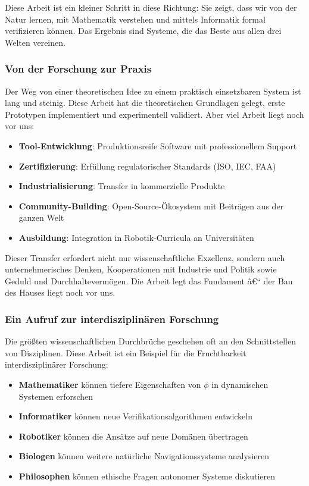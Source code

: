 ﻿\documentclass[a4paper,12pt]{article}
\theoremstyle{definition}
\begin{document}
Diese Arbeit ist ein kleiner Schritt in diese Richtung: Sie zeigt, dass wir von der Natur lernen, mit Mathematik verstehen und mittels Informatik formal verifizieren können. Das Ergebnis sind Systeme, die das Beste aus allen drei Welten vereinen.

\subsubsection{Von der Forschung zur Praxis}

Der Weg von einer theoretischen Idee zu einem praktisch einsetzbaren System ist lang und steinig. Diese Arbeit hat die theoretischen Grundlagen gelegt, erste Prototypen implementiert und experimentell validiert. Aber viel Arbeit liegt noch vor uns:

\begin{itemize}
	\item \textbf{Tool-Entwicklung}: Produktionsreife Software mit professionellem Support
	\item \textbf{Zertifizierung}: Erfüllung regulatorischer Standards (ISO, IEC, FAA)
	\item \textbf{Industrialisierung}: Transfer in kommerzielle Produkte
	\item \textbf{Community-Building}: Open-Source-Ökosystem mit Beiträgen aus der ganzen Welt
	\item \textbf{Ausbildung}: Integration in Robotik-Curricula an Universitäten
\end{itemize}

Dieser Transfer erfordert nicht nur wissenschaftliche Exzellenz, sondern auch unternehmerisches Denken, Kooperationen mit Industrie und Politik sowie Geduld und Durchhaltevermögen. Die Arbeit legt das Fundament â€“ der Bau des Hauses liegt noch vor uns.

\subsubsection{Ein Aufruf zur interdisziplinären Forschung}

Die größten wissenschaftlichen Durchbrüche geschehen oft an den Schnittstellen von Disziplinen. Diese Arbeit ist ein Beispiel für die Fruchtbarkeit interdisziplinärer Forschung:

\begin{itemize}
	\item \textbf{Mathematiker} können tiefere Eigenschaften von $\phi$ in dynamischen Systemen erforschen
	\item \textbf{Informatiker} können neue Verifikationsalgorithmen entwickeln
	\item \textbf{Robotiker} können die Ansätze auf neue Domänen übertragen
	\item \textbf{Biologen} können weitere natürliche Navigationssysteme analysieren
	\item \textbf{Philosophen} können ethische Fragen autonomer Systeme diskutieren
\end{itemize}
\end{document}
